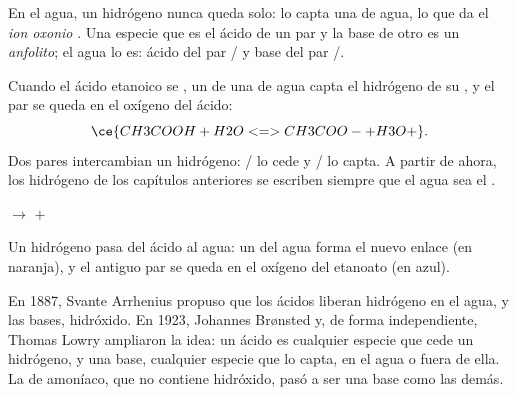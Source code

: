\begin{definition}\label{def:g12:ka-and-pka:oxonium}
En el agua, un  hidrógeno nunca queda solo: lo capta una  de
agua, lo que da el \emph{ion oxonio} . Una
especie que es el ácido de un par y la base de otro es un
\emph{anfolito}; el agua lo es: ácido del par
/ y base del par /.
\end{definition}

\begin{example}\label{ex:g12:ka-and-pka:acid-water}
Cuando el ácido etanoico se , un  de una  de
agua capta el hidrógeno de su , y el par  se queda en el
oxígeno del ácido:
\[
  \ce{CH3COOH + H2O <=> CH3COO- + H3O+} .
\]
Dos pares intercambian un  hidrógeno: / lo
cede y / lo capta. A partir de ahora, los 
hidrógeno de los capítulos anteriores se escriben  siempre que el
agua sea el .
\end{example}

\begin{omfigure}
\qquad
{}
\qquad$\longrightarrow$\qquad
{}\quad$+$\quad{}

{\small Un  hidrógeno pasa del ácido al agua: un  del agua
forma el nuevo enlace  (en naranja), y el antiguo par  se
queda en el oxígeno del  etanoato (en azul).}
\end{omfigure}

\begin{history}
En 1887, Svante Arrhenius propuso que los ácidos liberan  hidrógeno
en el agua, y las bases,  hidróxido. En 1923, Johannes Brønsted y,
de forma independiente, Thomas Lowry ampliaron la idea: un ácido es
cualquier especie que cede un  hidrógeno, y una base, cualquier
especie que lo capta, en el agua o fuera de ella. La  de
amoníaco, que no contiene hidróxido, pasó a ser una base como las demás.
\end{history}

